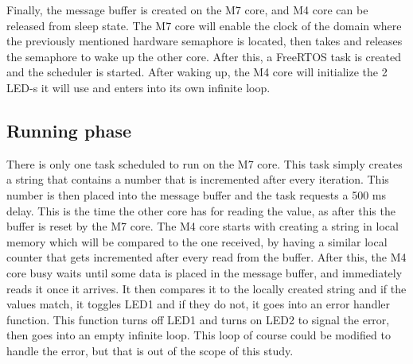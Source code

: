 Finally, the message buffer is created on the M7 core, and M4 core can be released from sleep state. The M7 core will enable the clock of the domain where the previously mentioned hardware semaphore is located, then takes and releases the semaphore to wake up the other core. After this, a FreeRTOS task is created and the scheduler is started. After waking up, the M4 core will initialize the 2 LED-s it will use and enters into its own infinite loop.

\subsection{Running phase}

There is only one task scheduled to run on the M7 core. This task simply creates a string that contains a number that is incremented after every iteration. This number is then placed into the message buffer and the task requests a 500 ms delay. This is the time the other core has for reading the value, as after this the buffer is reset by the M7 core. The M4 core starts with creating a string in local memory which will be compared to the one received, by having a similar local counter that gets incremented after every read from the buffer. After this, the M4 core busy waits until some data is placed in the message buffer, and immediately reads it once it arrives. It then compares it to the locally created string and if the values match, it toggles LED1 and if they do not, it goes into an error handler function. This function turns off LED1 and turns on LED2 to signal the error, then goes into an empty infinite loop. This loop of course could be modified to handle the error, but that is out of the scope of this study.
